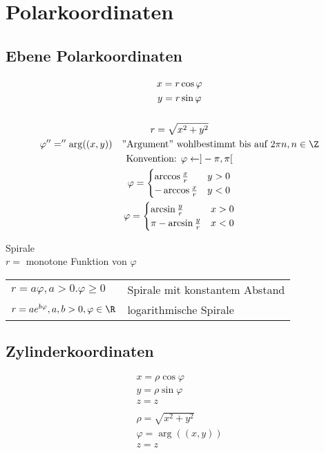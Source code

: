 \section{Polarkoordinaten}
\subsection{Ebene Polarkoordinaten}
\begin{gather*}
	x = r \cos \varphi \\
	y = r \sin \varphi \\
	\\
	r = \sqrt{x^2 + y^2} \\
	\varphi ''='' \arg((x,y)) \quad \text{''Argument'' wohlbestimmt bis auf $2\pi n , n \in \Z$} \\
	\text{Konvention: } \varphi \leftarrow ] -\pi , \pi [ \\
	\varphi = \begin{cases}
		\arccos \frac{x}{r}	&y > 0	\\
		-\arccos \frac{x}{r}	&y < 0	
	\end{cases} \\
	\varphi = \begin{cases}
		\arcsin \frac{y}{r}	&x > 0	\\
		\pi -\arcsin \frac{y}{r}	&x < 0	
	\end{cases}
\end{gather*}

\begin{bsp*}
	Spirale \\
	$r =$ monotone Funktion von $\varphi$ \\
	\begin{tabular}{ll}
		$r = a \varphi , a > 0 . \varphi \geq 0$			&Spirale mit konstantem Abstand	\\
		$r = a e^{b\varphi} , a, b > 0 , \varphi \in \R$	&logarithmische Spirale		
	\end{tabular}
\end{bsp*}

\subsection{Zylinderkoordinaten}
\begin{gather*}
	x = \rho \cos \varphi \\
	y = \rho \sin \varphi \\
	z = z \\
	\\
	\rho = \sqrt{x^2 + y^2} \\
	\varphi = \arg((x,y)) \\
	z = z
\end{gather*}

